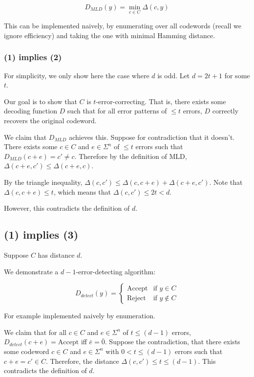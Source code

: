 \documentclass{idc_msc}
\begin{document}
\[ D_{MLD}(y) = \min_{c \in C} \Delta(c,y)\]

This can be implemented naively, by enumerating over all codewords (recall we ignore efficiency) and taking the one with minimal Hamming distance.

\subsubsection{(1) implies (2)}

For simplicity, we only show here the case where $d$ is odd. Let $d = 2t + 1$ for some $t$.

Our goal is to show that $C$ is $t$-error-correcting.
That is, there exists some decoding function $D$ such that for all error patterns of $\le t$ errors, $D$ correctly recovers the original codeword.

We claim that $D_{MLD}$ achieves this.
Suppose for contradiction that it doesn't.
There exists some $c \in C$ and $e \in \Sigma^n$ of $\le t$ errors such that $D_{MLD}(c + e) = c' \ne c$.
Therefore by the definition of MLD, $\Delta(c + e,c') \le \Delta(c + e, c)$.

By the triangle inequality, $\Delta(c, c') \le \Delta(c, c+e) + \Delta(c+e, c')$.
Note that $\Delta(c,c+e) \le t$, which means that $\Delta(c, c') \le 2t < d$.

However, this contradicts the definition of $d$.

\subsection{(1) implies (3)}

Suppose $C$ has distance $d$.

We demonstrate a $d-1$-error-detecting algorithm:

\[
  D_{detect}(y) = \begin{cases}
    \text{Accept} & \text{if } y \in C \\
    \text{Reject} & \text{if } y \notin C
  \end{cases}
\]

For example implemented naively by enumeration.

We claim that for all $c \in C$ and $e \in \Sigma^n$ of $t \le (d-1)$ errors,
$D_{detect}(c+e) = \text{Accept}$ iff $\bar{e} = \bar{0}$.
Suppose the contradiction, that there exists some codeword $c \in C$ and $e \in \Sigma^n$ with $0 < t \le (d-1)$ errors such that $c+e = c' \in C$.
Therefore, the distance $\Delta(c, c') \le t \le (d-1)$.
This contradicts the definition of $d$.
\end{document}
